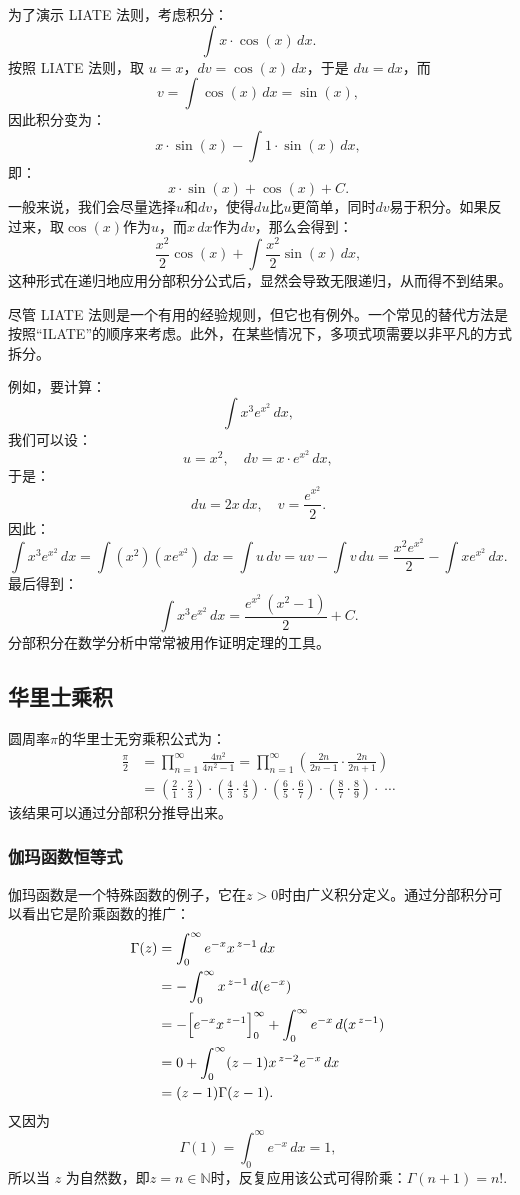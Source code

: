 为了演示 LIATE 法则，考虑积分：
$$
\int x \cdot \cos(x)\,dx.~
$$
按照 LIATE 法则，取 $u = x$，$dv = \cos(x)\,dx$，于是 $du = dx$，而
$$
v = \int \cos(x)\,dx = \sin(x),~
$$
因此积分变为：
$$
x \cdot \sin(x) - \int 1 \cdot \sin(x)\,dx,~
$$
即：
$$
x \cdot \sin(x) + \cos(x) + C.~
$$
一般来说，我们会尽量选择$u$和$dv$，使得$du$比$u$更简单，同时$dv$易于积分。如果反过来，取$\cos(x)$作为$u$，而$x\,dx$作为$dv$，那么会得到：
$$
\frac{x^{2}}{2}\cos(x) + \int \frac{x^{2}}{2}\sin(x)\,dx,~
$$
这种形式在递归地应用分部积分公式后，显然会导致无限递归，从而得不到结果。

尽管 LIATE 法则是一个有用的经验规则，但它也有例外。一个常见的替代方法是按照“ILATE”的顺序来考虑。此外，在某些情况下，多项式项需要以非平凡的方式拆分。

例如，要计算：
$$
\int x^{3}e^{x^{2}}\,dx,~
$$
我们可以设：
$$
u = x^{2}, \quad dv = x \cdot e^{x^{2}}\,dx,~
$$
于是：
$$
du = 2x\,dx, \quad v = \frac{e^{x^{2}}}{2}.~
$$
因此：
$$
\int x^{3}e^{x^{2}}\,dx 
= \int (x^{2})(x e^{x^{2}})\,dx
= \int u\,dv
= uv - \int v\,du
= \frac{x^{2}e^{x^{2}}}{2} - \int xe^{x^{2}}\,dx.~
$$
最后得到：
$$
\int x^{3}e^{x^{2}}\,dx = \frac{e^{x^{2}}\,(x^{2}-1)}{2} + C.~
$$
分部积分在数学分析中常常被用作证明定理的工具。
\subsection{华里士乘积}
圆周率$\pi$的华里士无穷乘积公式为：
$$
\begin{aligned}
\frac{\pi}{2} 
&= \prod_{n=1}^{\infty} \frac{4n^{2}}{4n^{2}-1} 
= \prod_{n=1}^{\infty} \left(\frac{2n}{2n-1} \cdot \frac{2n}{2n+1}\right)\\
&= \left(\frac{2}{1}\cdot\frac{2}{3}\right)\cdot\left(\frac{4}{3}\cdot\frac{4}{5}\right)\cdot\left(\frac{6}{5}\cdot\frac{6}{7}\right)\cdot\left(\frac{8}{7}\cdot\frac{8}{9}\right)\cdot\;\cdots
\end{aligned}~
$$
该结果可以通过分部积分推导出来。
\subsubsection{伽玛函数恒等式}
伽玛函数是一个特殊函数的例子，它在$z > 0$时由广义积分定义。通过分部积分可以看出它是阶乘函数的推广：
$$
\begin{aligned}
\Gamma(z) &= \int_{0}^{\infty} e^{-x}x^{\,z-1}\,dx\\
&= -\int_{0}^{\infty} x^{\,z-1}\,d(e^{-x})\\
&= -\Bigl[e^{-x}x^{\,z-1}\Bigr]_{0}^{\infty} + \int_{0}^{\infty} e^{-x}\,d(x^{\,z-1})\\
&= 0 + \int_{0}^{\infty} (z-1)x^{\,z-2}e^{-x}\,dx\\
&= (z-1)\Gamma(z-1).
\end{aligned}~
$$
又因为
$$
\Gamma(1) = \int_{0}^{\infty} e^{-x}\,dx = 1,~
$$
所以当 $z$ 为自然数，即$z = n \in \mathbb{N}$时，反复应用该公式可得阶乘：$
\Gamma(n+1) = n!$.
